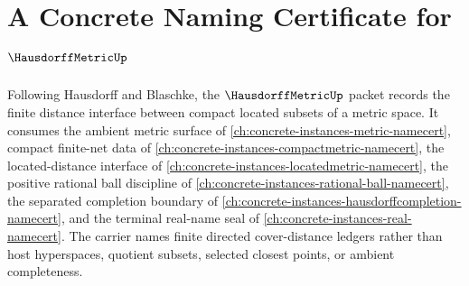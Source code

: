 \chapter{A Concrete Naming Certificate for $\HausdorffMetricUp$}
\label{ch:concrete-instances-hausdorffmetric-namecert}

Following Hausdorff and Blaschke, the $\HausdorffMetricUp$ packet records the finite distance interface between compact located subsets of a metric space. It consumes the ambient metric surface of \autoref{ch:concrete-instances-metric-namecert}, compact finite-net data of \autoref{ch:concrete-instances-compactmetric-namecert}, the located-distance interface of \autoref{ch:concrete-instances-locatedmetric-namecert}, the positive rational ball discipline of \autoref{ch:concrete-instances-rational-ball-namecert}, the separated completion boundary of \autoref{ch:concrete-instances-hausdorffcompletion-namecert}, and the terminal real-name seal of \autoref{ch:concrete-instances-real-namecert}. The carrier names finite directed cover-distance ledgers rather than host hyperspaces, quotient subsets, selected closest points, or ambient completeness.

